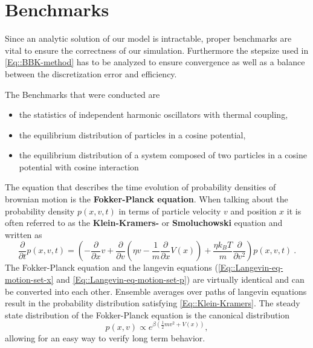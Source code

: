 	\section{Benchmarks}
	Since an analytic solution of our model is intractable, proper benchmarks are vital to ensure the correctness of our simulation. Furthermore the stepsize used in \autoref{Eq::BBK-method} has to be analyzed to ensure convergence as well as a balance between the discretization error and efficiency.
	
	The Benchmarks that were conducted are   
	\begin{itemize}
		\item the statistics of independent harmonic oscillators with thermal coupling,
		\item the equilibrium distribution of particles in a cosine potential,
		\item the equilibrium distribution of a system composed of two particles in a cosine potential with cosine interaction
	\end{itemize}			
	The equation that describes the time evolution of probability densities of brownian motion is the \textbf{Fokker-Planck equation}. When talking about the probability density $p(x, v, t)$ in terms of particle velocity $v$ and position $x$ it is often referred to as the \textbf{Klein-Kramers-} or \textbf{Smoluchowski} equation and written as
	\begin{equation} \label{Eq::Klein-Kramers}
	\frac{\partial}{\partial t} p(x, v, t) = \left(-\frac{\partial}{\partial x} v + \frac{\partial}{\partial v} \left(\eta v - \frac{1}{m} \frac{\partial}{\partial x} V(x) \right) + \frac{\eta k_B T}{m} \frac{\partial}{\partial v^2}\right)p(x, v, t) ~.
	\end{equation}
	The Fokker-Planck equation and the langevin equations (\autoref{Eq::Langevin-eq-motion-set-x} and \autoref{Eq::Langevin-eq-motion-set-p}) are virtually identical and can be converted into each other. Ensemble averages over paths of langevin equations result in the probability distribution satisfying \autoref{Eq::Klein-Kramers}. The steady state distribution of the Fokker-Planck equation is the canonical distribution
	\begin{equation} \label{Eq::Canonical-Dist}
		p(x, v) \propto e^{\beta \left( \tfrac{1}{2} m v^2 + V(x)\right)},	
	\end{equation}
	allowing for an easy way to verify long term behavior.  
